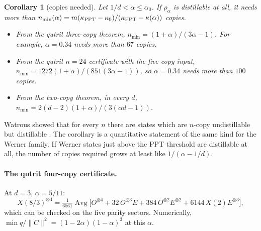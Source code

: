 \documentclass[11pt]{article}
\newtheorem{corollary}[theorem]{Corollary}
\theoremstyle{remark}
\newcommand{\Avg}{\operatorname{Avg}}
\begin{document}
\begin{corollary}[copies needed]
Let $1/d<\alpha\le\alpha_0$. If $\rho_\alpha$ is distillable at all, it needs more than
$n_{\min}(\alpha)=m(\kappa_{\rm PPT}-\kappa_0)/(\kappa_{\rm PPT}-\kappa(\alpha))$ copies.
\begin{itemize}
\item From the qutrit three-copy theorem, $n_{\min}=(1+\alpha)/(3\alpha-1)$. For example, $\alpha=0.34$ needs more
than $67$ copies.
\item From the qutrit $n=24$ certificate with the five-copy input, $n_{\min}=1272(1+\alpha)/(851(3\alpha-1))$, so
$\alpha=0.34$ needs more than $100$ copies.
\item From the two-copy theorem, in every $d$, $n_{\min}=2(d-2)(1+\alpha)/(3(\alpha d-1))$.
\end{itemize}
\end{corollary}
Watrous showed that for every $n$ there are states which are $n$-copy undistillable but distillable \cite{Wat}.
The corollary is a quantitative statement of the same kind for the Werner family. If Werner states just above the
PPT threshold are distillable at all, the number of copies required grows at least like $1/(\alpha-1/d)$.

\paragraph{The qutrit four-copy certificate.} At $d=3$, $\alpha=5/11$:
\[
X(8/3)^{\otimes4}=\tfrac1{6561}\Avg\big[O^{\otimes4}+32\,O^{\otimes3}E+384\,O^{\otimes2}E^{\otimes2}+6144\,X(2)E^{\otimes3}\big],
\]
which can be checked on the five parity sectors. Numerically, $\min q/\|C\|^2=(1-2\alpha)(1-\alpha)^3$ at this
$\alpha$.
\end{document}
